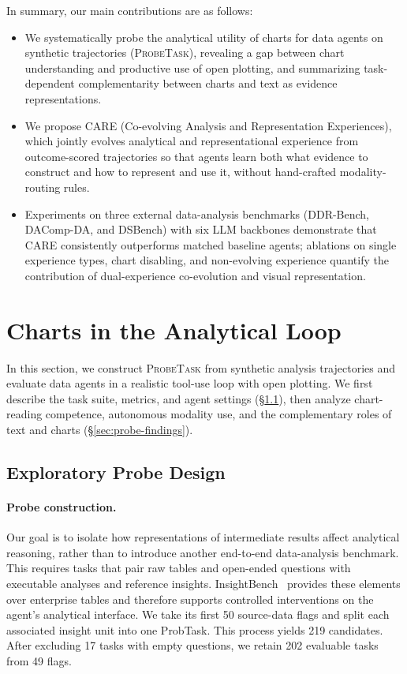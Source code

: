 \documentclass{article}
\newcommand{\probe}{\textsc{ProbeTask}}
\begin{document}
In summary, our main contributions are as follows:
\begin{itemize}
  \item We systematically probe the analytical utility of charts for data agents on synthetic trajectories (\probe{}), revealing a gap between chart understanding and productive use of open plotting, and summarizing task-dependent complementarity between charts and text as evidence representations.
  \item We propose \textsc{CARE} (Co-evolving Analysis and Representation Experiences), which jointly evolves analytical and representational experience from outcome-scored trajectories so that agents learn both what evidence to construct and how to represent and use it, without hand-crafted modality-routing rules.
  \item Experiments on three external data-analysis benchmarks (DDR-Bench, DAComp-DA, and DSBench) with six LLM backbones demonstrate that \textsc{CARE} consistently outperforms matched baseline agents; ablations on single experience types, chart disabling, and non-evolving experience quantify the contribution of dual-experience co-evolution and visual representation.
\end{itemize}



\section{Charts in the Analytical Loop}
\label{sec:probe}

In this section, we construct \probe{} from synthetic analysis trajectories and evaluate data agents in a realistic tool-use loop with open plotting.
We first describe the task suite, metrics, and agent settings (\S\ref{sec:probe-setup}), then analyze chart-reading competence, autonomous modality use, and the complementary roles of text and charts (\S\ref{sec:probe-findings}).

\subsection{Exploratory Probe Design}
\label{sec:probe-setup}

\paragraph{Probe construction.}
Our goal is to isolate how representations of intermediate results affect analytical reasoning, rather than to introduce another end-to-end data-analysis benchmark.
This requires tasks that pair raw tables and open-ended questions with executable analyses and reference insights.
InsightBench~\citep{sahu2025insightbench} provides these elements over enterprise tables and therefore supports controlled interventions on the agent's analytical interface.
We take its first 50 source-data flags and split each associated insight unit into one ProbTask.
This process yields 219 candidates.
After excluding 17 tasks with empty questions, we retain 202 evaluable tasks from 49 flags.
\end{document}
